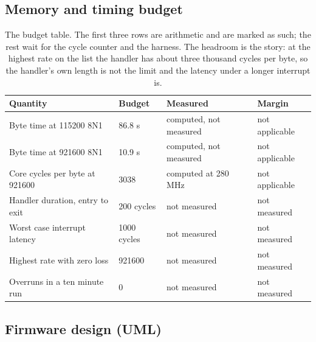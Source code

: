 \subsection*{Memory and timing budget}


\begin{table}[H]\centering\small
\begin{tabular}{p{44mm}p{28mm}p{28mm}p{30mm}}
\toprule
Quantity & Budget & Measured & Margin \\
\midrule
Byte time at 115200 8N1 & 86.8 \textmu{}s & computed, not measured & not applicable \\
Byte time at 921600 8N1 & 10.9 \textmu{}s & computed, not measured & not applicable \\
Core cycles per byte at 921600 & 3038 & computed at 280 MHz & not applicable \\
Handler duration, entry to exit & 200 cycles & not measured & not measured \\
Worst case interrupt latency & 1000 cycles & not measured & not measured \\
Highest rate with zero loss & 921600 & not measured & not measured \\
Overruns in a ten minute run & 0 & not measured & not measured \\
\bottomrule
\end{tabular}
\caption{The budget table. The first three rows are arithmetic and are marked as such; the rest wait for the cycle counter and the harness. The headroom is the story: at the highest rate on the list the handler has about three thousand cycles per byte, so the handler's own length is not the limit and the latency under a longer interrupt is.}
\end{table}

\subsection*{Firmware design (UML)}


